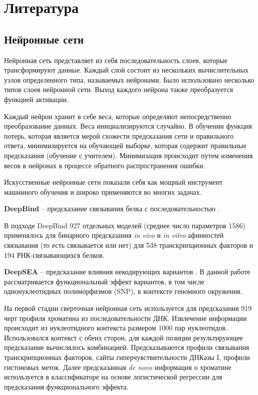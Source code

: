 \section{Литература}
\subsection{Нейронные сети}
Нейронная сеть представляет из себя последовательность слоев, которые трансформируют данные. Каждый слой состоит из нескольких вычислительных узлов определенного типа, называемых нейронами. Было использовано несколько типов слоев нейронной сети.
Выход каждого нейрона также преобразуется функцией активации.

Каждый нейрон хранит в себе веса, которые определяют непосредственно преобразование данных. Веса инициализируются случайно.
В обучении функция потерь, которая является мерой схожести предсказания сети и правильного ответа, минимизируется на обучающей выборке, которая содержит правильные предсказания (обучение с учителем). Минимизация происходит путем изменения весов в нейронах в процессе обратного распространения ошибки.

Искусственные нейронные сети показали себя как мощный инструмент машинного обучения и широко применяются во многих задачах.

{\bfseries DeepBind} -- предсказание связывания белка с последовательностью \cite{alipanahi_predicting_2015}.

В подходе DeepBind 927 отдельных моделей (среднее число параметров 1586) применялось для бинарного предсказания \emph{in vivo} и \emph{in vitro} афинностей связывания (то есть связывается или нет) для 538 транскрипционных факторов и 194 РНК-связывающихся белков.


{\bfseries DeepSEA} -- предсказание влияния некодирующих вариантов \cite{zhou_predicting_2015}.
 В данной работе рассматривается функциональный эффект вариантов, в том числе однонуклеотидных полиморфизмов (SNP), в контексте геномного окружения. 

На первой стадии сверточная нейронная сеть используется для предсказания 919 черт профиля хроматина из последовательности ДНК. Извлечение  информации происходит из нуклеотидного контекста размером 1000 пар нуклеотидов. Использовался контекст с обеих сторон, для каждой позиции результирующее предсказание вычислялось комбинацией. Предсказываются профили связывания транскрипционных факторов, сайты гиперчувствительности ДНКазы I, профили гистоновых меток. Далее предсказанная \emph{de novo} информация о хроматине используется в классификаторе на основе логистической регрессии для предсказания функционального эффекта.

